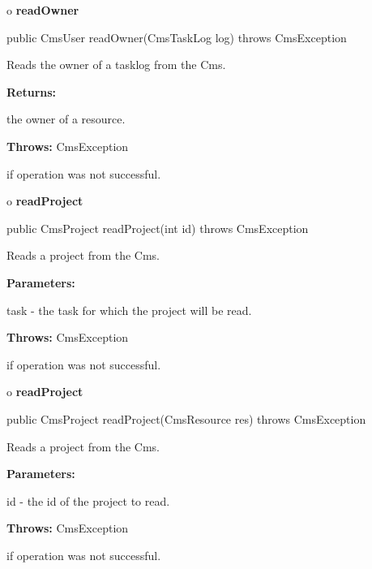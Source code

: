 o {\bf readOwner}

\begin{PRE}
 public CmsUser readOwner(CmsTaskLog log) throws CmsException
\end{PRE}

\begin{description}
\htmlDD Reads the owner of a tasklog from the Cms.

\begin{description}
\item {\bf Returns:}

the owner of a resource.
\item {\bf Throws:} CmsException

if operation was not successful.
\end{description}

\end{description}

o {\bf readProject}

\begin{PRE}
 public CmsProject readProject(int id) throws CmsException
\end{PRE}

\begin{description}
\htmlDD Reads a project from the Cms.

\begin{description}
\item {\bf Parameters:}

task - the task for which the project will be read.
\item {\bf Throws:} CmsException

if operation was not successful.
\end{description}

\end{description}

o {\bf readProject}

\begin{PRE}
 public CmsProject readProject(CmsResource res) throws CmsException
\end{PRE}

\begin{description}
\htmlDD Reads a project from the Cms.

\begin{description}
\item {\bf Parameters:}

id - the id of the project to read.
\item {\bf Throws:} CmsException

if operation was not successful.
\end{description}

\end{description}

